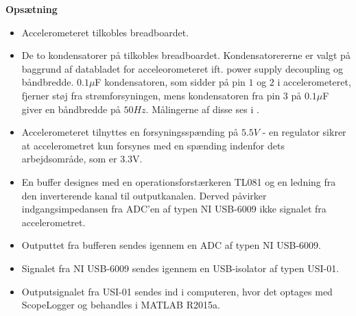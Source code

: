 \textbf{Opsætning}\label{Opsaetning}
\begin{itemize}
\item Accelerometeret tilkobles breadboardet.
\item De to kondensatorer på tilkobles breadboardet. Kondensatorererne er valgt på baggrund af databladet for acceleorometeret ift. power supply decoupling og båndbredde. $0.1\mu$F kondensatoren, som sidder på pin $1$ og $2$ i accelerometeret, fjerner støj fra strømforsyningen, mens kondensatoren fra pin $3$ på $0.1\mu$F giver en båndbredde på $50Hz$. Målingerne af disse ses i .
\item Accelerometeret tilnyttes en forsyningsspænding på $5.5V$ - en regulator sikrer at accelerometret kun forsynes med en spænding indenfor dets arbejdsområde, som er $3.3$V.
\item En buffer designes med en operationsforstærkeren TL081 og en ledning fra den inverterende kanal til outputkanalen. Derved påvirker indgangsimpedansen fra ADC'en af typen NI USB-6009 ikke signalet fra accelerometret.
\item Outputtet fra bufferen sendes igennem en ADC af typen NI USB-6009.
\item Signalet fra NI USB-6009 sendes igennem en USB-isolator af typen USI-01.
\item Outputsignalet fra USI-01 sendes ind i computeren, hvor det optages med ScopeLogger og behandles i MATLAB R2015a.
\end{itemize}


